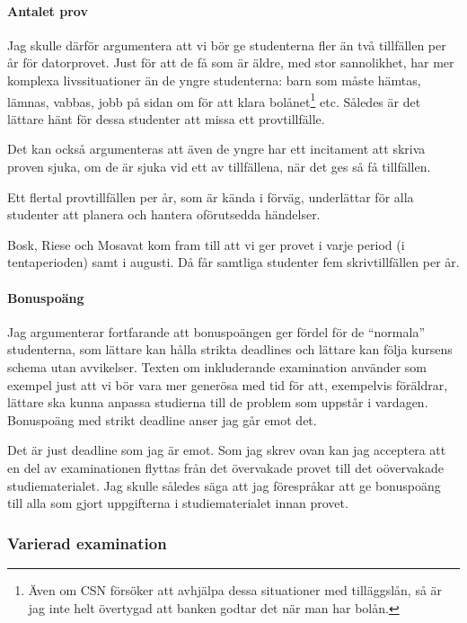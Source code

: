 \paragraph{Antalet prov}

Jag skulle därför argumentera att vi bör ge studenterna fler än två tillfällen 
per år för datorprovet.
Just för att de få som är äldre, med stor sannolikhet, har mer komplexa 
livssituationer än de yngre studenterna:
barn som måste hämtas, lämnas, vabbas, jobb på sidan om för att klara 
bolånet\footnote{%
  Även om CSN försöker att avhjälpa dessa situationer med tilläggslån, så är 
  jag inte helt övertygad att banken godtar det när man har bolån.
} etc.
Således är det lättare hänt för dessa studenter att missa ett provtillfälle.

Det kan också argumenteras att även de yngre har ett incitament att skriva 
proven sjuka, om de är sjuka vid ett av tillfällena, när det ges så få 
tillfällen.

Ett flertal provtillfällen per år, som är kända i förväg, underlättar för alla 
studenter att planera och hantera oförutsedda händelser.

Bosk, Riese och Mosavat kom fram till att vi ger provet i varje period (i 
tentaperioden) samt i augusti.
Då får samtliga studenter fem skrivtillfällen per år.

\paragraph{Bonuspoäng}

Jag argumenterar fortfarande att bonuspoängen ger fördel för de 
\enquote{normala} studenterna, som lättare kan hålla strikta deadlines och 
lättare kan följa kursens schema utan avvikelser.
Texten om inkluderande examination använder som exempel just att vi bör vara 
mer generösa med tid för att, exempelvis föräldrar, lättare ska kunna anpassa 
studierna till de problem som uppstår i vardagen.
Bonuspoäng med strikt deadline anser jag går emot det.

Det är just deadline som jag är emot.
Som jag skrev ovan kan jag acceptera att en del av examinationen flyttas från 
det övervakade provet till det oövervakade studiematerialet.
Jag skulle således säga att jag förespråkar att ge bonuspoäng till alla som 
gjort uppgifterna i studiematerialet innan provet.


\subsubsection{Varierad examination}

